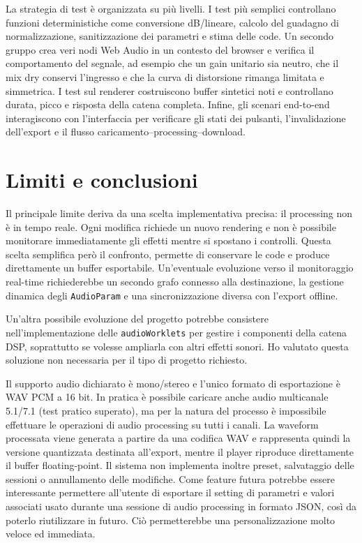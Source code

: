 \documentclass[11pt,a4paper]{article}
\begin{document}
	La strategia di test è organizzata su più livelli. I test più semplici controllano funzioni deterministiche come conversione dB/lineare, calcolo del guadagno di normalizzazione, sanitizzazione dei parametri e stima delle code. Un secondo gruppo crea veri nodi Web Audio in un contesto del browser e verifica il comportamento del segnale, ad esempio che un gain unitario sia neutro, che il mix dry conservi l'ingresso e che la curva di distorsione rimanga limitata e simmetrica. I test sul renderer costruiscono buffer sintetici noti e controllano durata, picco e risposta della catena completa. Infine, gli scenari end-to-end interagiscono con l'interfaccia per verificare gli stati dei pulsanti, l'invalidazione dell'export e il flusso caricamento--processing--download.
	
	\section{Limiti e conclusioni}
	
	Il principale limite deriva da una scelta implementativa precisa: il processing non è in tempo reale. Ogni modifica richiede un nuovo rendering e non è possibile monitorare immediatamente gli effetti mentre si spostano i controlli. Questa scelta semplifica però il confronto, permette di conservare le code e produce direttamente un buffer esportabile. Un'eventuale evoluzione verso il monitoraggio real-time richiederebbe un secondo grafo connesso alla destinazione, la gestione dinamica degli \texttt{AudioParam} e una sincronizzazione diversa con l'export offline.
	
	Un'altra possibile evoluzione del progetto potrebbe consistere nell'implementazione delle \texttt{audioWorklets} per gestire i componenti della catena DSP, soprattutto se volesse ampliarla con altri effetti sonori. Ho valutato questa soluzione non necessaria per il tipo di progetto richiesto.
	
	Il supporto audio dichiarato è mono/stereo e l'unico formato di esportazione è WAV PCM a 16 bit.
	In pratica è possibile caricare anche audio multicanale 5.1/7.1 (test pratico superato), ma per la natura del processo è impossibile effettuare le operazioni di audio processing su tutti i canali.
	La waveform processata viene generata a partire da una codifica WAV e rappresenta quindi la versione quantizzata destinata all'export, mentre il player riproduce direttamente il buffer floating-point. Il sistema non implementa inoltre preset, salvataggio delle sessioni o annullamento delle modifiche.
	Come feature futura potrebbe essere interessante permettere all'utente di esportare il setting di parametri e valori associati usato durante una sessione di audio processing in formato JSON, così da poterlo riutilizzare in futuro. Ciò permetterebbe una personalizzazione molto veloce ed immediata.
	
\end{document}
